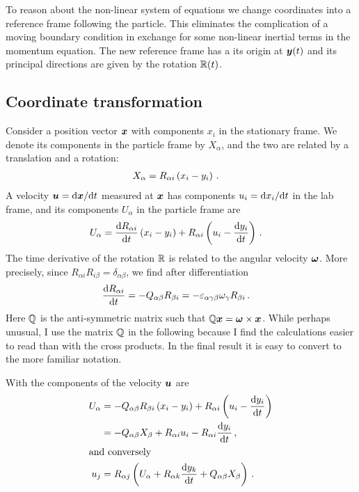 \documentclass[thesis.tex]{subfiles}
\begin{document}
To reason about the non-linear system of equations we change coordinates into a reference frame following the particle. This eliminates the complication of a moving boundary condition in exchange for some non-linear inertial terms in the momentum equation. The new reference frame has a its origin at $\mbox{\boldmath$y$}(t)$ and its principal directions are given by the rotation $\mathbb{R}(t)$.
\subsection{Coordinate transformation}
Consider a position vector $\mbox{\boldmath$x$}$ with components $x_i$ in the stationary frame. We denote its components in the particle frame by $X_\alpha$, and the two are related by a translation and a rotation:
\begin{align}
    X_\alpha &= R_{\alpha i}\left(x_i - y_i\right)\,.\eqnlab{transform}
\end{align}
A velocity $\mbox{\boldmath$u$} = \mathrm{d} \mbox{\boldmath$x$}/\mathrm{d} t$ measured at $\mbox{\boldmath$x$}$ has components $u_i=\mathrm{d} x_i/\mathrm{d} t$ in the lab frame, and its components $U_\alpha$ in the particle frame are 
\begin{align}
    U_\alpha &= \frac{\mathrm{d} R_{\alpha i}}{\mathrm{d} t}\left(x_i - y_i\right) + R_{\alpha i}\left(u_i - \frac{\mathrm{d} y_i}{\mathrm{d} t}\right)\,.
\end{align}
The time derivative of the rotation $\mathbb{R}$ is related to the angular velocity $\mbox{\boldmath$\omega$}$. More precisely, since $R_{\alpha i}R_{i\beta} = \delta_{\alpha\beta}$, we find after differentiation
\begin{align}
    \diff{R_{\alpha i}}{t} &= -Q_{\alpha \beta} R_{\beta i} = -\lc_{\alpha\gamma\beta}\omega_\gamma R_{\beta i}\,.\eqnlab{dRdt}
\end{align}
Here $\mathbb{Q}$ is the anti-symmetric matrix such that $\mathbb{Q}\mbox{\boldmath$x$} = \mbox{\boldmath$\omega$} \times \mbox{\boldmath$x$}$. While perhaps unusual, I use the matrix $\mathbb{Q}$ in the following because I find the calculations easier to read than with the cross products. In the final result it is easy to convert to the more familiar notation.

With  the components of the velocity $\mbox{\boldmath$u$}$ are
\begin{align}
    U_\alpha &= -Q_{\alpha \beta}R_{\beta i}\left(x_i - y_i\right) + R_{\alpha i}\left(u_i - \diff{y_i}{t}\right) \nn \\
    &= -Q_{\alpha \beta}X_\beta + R_{\alpha i}u_i - R_{\alpha i}\diff{y_i}{t}\,,\nn\\
    \intertext{and conversely}
    u_j &= R_{\alpha j}\left(U_\alpha + R_{\alpha k}\diff{y_k}{t} + Q_{\alpha \beta}X_\beta\right)\,.
    \eqnlab{u}
\end{align}
\end{document}
